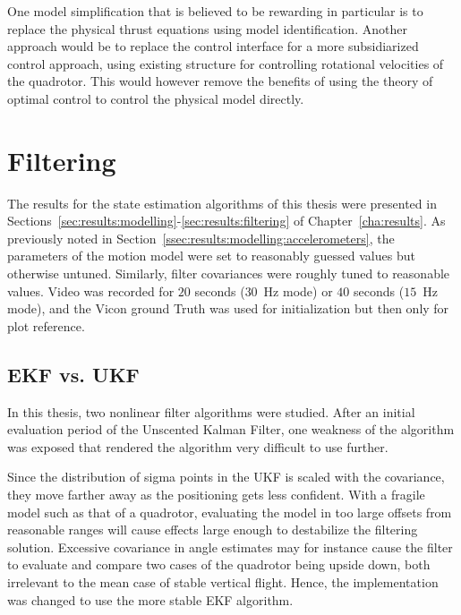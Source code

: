         One model simplification that is believed to be rewarding in particular
        is to replace the physical thrust equations using model identification.
        Another approach would be to replace the
        control interface for a more subsidiarized control approach, using
        existing structure for controlling rotational velocities of the
        quadrotor. This would however remove the benefits of using
        the theory of optimal control to control the physical model directly.

    \section{Filtering}
        The results for the state estimation algorithms of this thesis
        were presented in Sections~\ref{sec:results:modelling}-\ref{sec:results:filtering} of Chapter~\ref{cha:results}.
        As previously noted in Section~\ref{ssec:results:modelling:accelerometers},
        the parameters of the motion model were set to reasonably guessed values
        but otherwise untuned. Similarly, filter covariances were roughly
        tuned to reasonable values. Video was recorded for $20$ seconds ($30$~Hz mode)
        or $40$ seconds ($15$~Hz mode), and the Vicon ground Truth was used for
        initialization but then only for plot reference.

        \subsection{EKF vs. UKF}
            In this thesis, two nonlinear filter algorithms were studied.
            After an initial evaluation period of the Unscented Kalman Filter,
            one weakness of the algorithm was exposed that rendered the
            algorithm very difficult to use further.

            Since the distribution of sigma points in the UKF is scaled with
            the covariance, they move farther away as the positioning gets
            less confident.
            With a fragile model such as that of a quadrotor,
            evaluating the model in too large offsets from reasonable ranges
            will cause effects large enough to destabilize the filtering solution.
            Excessive covariance in angle estimates may for instance
            cause the filter to evaluate and compare two cases of the quadrotor
            being upside down, both irrelevant to the mean case of stable vertical flight.
            Hence, the implementation was changed to use the more stable EKF algorithm.

